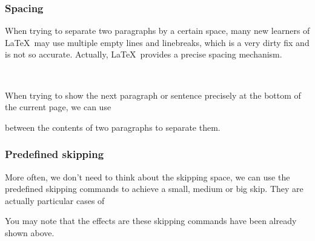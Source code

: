 \begin{frame}[fragile]
	\frametitle{Spacing}
	When trying to separate two paragraphs by a certain space, many new learners of \LaTeX\ may use multiple empty lines and linebreaks, which is a very dirty fix and is not so accurate. Actually, \LaTeX\ provides a precise spacing mechanism.
	\begin{command}
		\LC{\vspace{space}}\\
		\LC{\vspace*{space}}
	\end{command}
	When trying to show the next paragraph or sentence precisely at the bottom of the current page, we can use
	\begin{command}
		\LC{\vfill}
	\end{command}
	between the contents of two paragraphs to separate them.
\end{frame}

\begin{frame}[fragile]
	\frametitle{Predefined skipping}

	More often\footnotemark[1], we don't need to think about the skipping space, we can use the predefined skipping commands to achieve a small, medium or big skip. They are actually particular cases of \LC{\vspace}

	\begin{command}
		\LC{\smallskip}\smallskip
		
		\LC{\medskip}\medskip
		
		\LC{\bigskip}\bigskip
	\end{command}

	You may note that the effects are these skipping commands have been already shown above.	
\end{frame}

